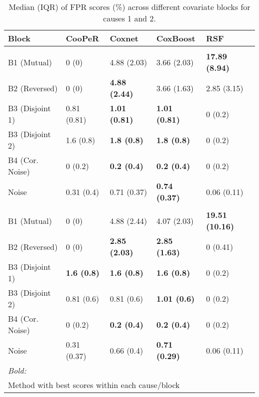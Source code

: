 \begin{table}
\centering
\caption{Median (IQR) of FPR scores (\%) across different covariate blocks for causes 1 and 2.\label{tab:fpr-median}}
\centering
\begin{tabular}[t]{lllll}
\toprule
Block & CooPeR & Coxnet & CoxBoost & RSF\\
\midrule
\addlinespace[0.3em]
\multicolumn{5}{l}{\textbf{Cause 1}}\\
\hspace{1em}B1 (Mutual) & 0 (0) & 4.88 (2.03) & 3.66 (2.03) & \textbf{17.89 (8.94)}\\
\hspace{1em}B2 (Reversed) & 0 (0) & \textbf{4.88 (2.44)} & 3.66 (1.63) & 2.85 (3.15)\\
\hspace{1em}B3 (Disjoint 1) & 0.81 (0.81) & \textbf{1.01 (0.81)} & \textbf{1.01 (0.81)} & 0 (0.2)\\
\hspace{1em}B3 (Disjoint 2) & 1.6 (0.8) & \textbf{1.8 (0.8)} & \textbf{1.8 (0.8)} & 0 (0.2)\\
\hspace{1em}B4 (Cor. Noise) & 0 (0.2) & \textbf{0.2 (0.4)} & \textbf{0.2 (0.4)} & 0 \vphantom{1} (0.2)\\
\hspace{1em}Noise & 0.31 (0.4) & 0.71 (0.37) & \textbf{0.74 (0.37)} & 0.06 (0.11)\\
\addlinespace[0.3em]
\multicolumn{5}{l}{\textbf{Cause 2}}\\
\hspace{1em}B1 (Mutual) & 0 (0) & 4.88 (2.44) & 4.07 (2.03) & \textbf{19.51 (10.16)}\\
\hspace{1em}B2 (Reversed) & 0 (0) & \textbf{2.85 (2.03)} & \textbf{2.85 (1.63)} & 0 (0.41)\\
\hspace{1em}B3 (Disjoint 1) & \textbf{1.6 (0.8)} & \textbf{1.6 (0.8)} & \textbf{1.6 (0.8)} & 0 (0.2)\\
\hspace{1em}B3 (Disjoint 2) & 0.81 (0.6) & 0.81 (0.6) & \textbf{1.01 (0.6)} & 0 (0.2)\\
\hspace{1em}B4 (Cor. Noise) & 0 (0.2) & \textbf{0.2 (0.4)} & \textbf{0.2 (0.4)} & 0 (0.2)\\
\hspace{1em}Noise & 0.31 (0.37) & 0.66 (0.4) & \textbf{0.71 (0.29)} & 0.06 (0.11)\\
\bottomrule
\multicolumn{5}{l}{\rule{0pt}{1em}\textit{Bold:}}\\
\multicolumn{5}{l}{\rule{0pt}{1em}Method with best scores within each cause/block}\\
\end{tabular}
\end{table}
